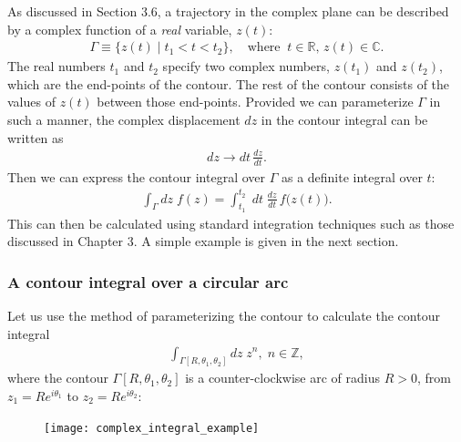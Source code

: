 \documentclass[10pt,a4paper]{article}
\begin{document}
As discussed in Section 3.6, a trajectory in the complex plane can be
described by a complex function of a \textit{real} variable, $z(t)$:
\begin{align}
  \Gamma \equiv \Big\{z(t) \;\Big|\; t_1 < t < t_2\Big\}, \quad \mathrm{where}\;\; t \in \mathbb{R}, \,z(t) \in \mathbb{C}.
\end{align}
The real numbers $t_1$ and $t_2$ specify two complex numbers, $z(t_1)$
and $z(t_2)$, which are the end-points of the contour. The rest of the
contour consists of the values of $z(t)$ between those
end-points. Provided we can parameterize $\Gamma$ in such a manner,
the complex displacement $dz$ in the contour integral can be written
as
\begin{align}
  dz \rightarrow dt\, \frac{dz}{dt}.
\end{align}
Then we can express the contour integral over $\Gamma$ as a definite
integral over $t$:
\begin{align}
  \int_\Gamma dz\; f(z) = \int_{t_1}^{t_2} \; dt\; \frac{dz}{dt}\, f\big(z(t)\big).
\end{align}
This can then be calculated using standard integration techniques such
as those discussed in Chapter 3. A simple example is given in the next
section.

\subsubsection{A contour integral over a circular arc}
\label{arc-contour}

Let us use the method of parameterizing the contour to calculate the
contour integral
\begin{align}
  \int_{\Gamma[R, \theta_1,\theta_2]} dz\; z^n,\; n\in\mathbb{Z},
\end{align}
where the contour $\Gamma[R, \theta_1,\theta_2]$ is a
counter-clockwise arc of radius $R > 0$, from $z_1 = R e^{i\theta_1}$
to $z_2 = R e^{i\theta_2}$:

\begin{figure}[H]
  \centering\texttt{[image: complex\_integral\_example]}
\end{figure}
\end{document}
